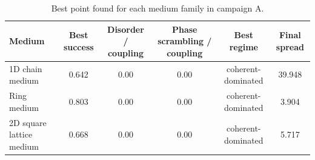 \begin{table}[t]
\centering
\caption{Best point found for each medium family in campaign A.}
\begin{tabular}{lccccc}
\toprule
Medium & Best success & Disorder / coupling & Phase scrambling / coupling & Best regime & Final spread \\
\midrule
1D chain medium & 0.642 & 0.00 & 0.00 & coherent-dominated & 39.948 \\
Ring medium & 0.803 & 0.00 & 0.00 & coherent-dominated & 3.904 \\
2D square lattice medium & 0.668 & 0.00 & 0.00 & coherent-dominated & 5.717 \\
\bottomrule
\end{tabular}
\end{table}
